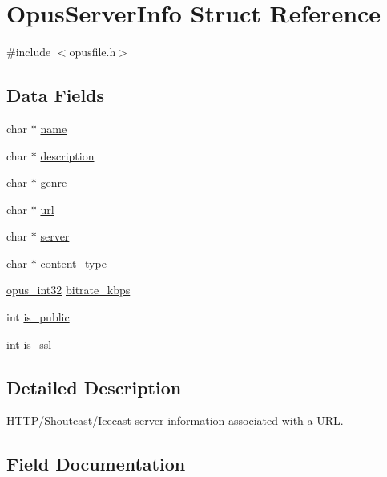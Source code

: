 \hypertarget{struct_opus_server_info}{}\section{Opus\+Server\+Info Struct Reference}
\label{struct_opus_server_info}


{\ttfamily \#include $<$opusfile.\+h$>$}

\subsection*{Data Fields}
\begin{DoxyCompactItemize}
\item 
char $\ast$ \hyperlink{struct_opus_server_info_a6c1e013bd64991b75709ef1d76f962b6}{name}
\item 
char $\ast$ \hyperlink{struct_opus_server_info_ab16d58f0d67d6473e12629676e2641ca}{description}
\item 
char $\ast$ \hyperlink{struct_opus_server_info_a293431ddf20c3baa3a4751ad08f518bb}{genre}
\item 
char $\ast$ \hyperlink{struct_opus_server_info_a7f9aef47413c849bb240ef70394401b1}{url}
\item 
char $\ast$ \hyperlink{struct_opus_server_info_a7aa583abd214ca9cefab6c1c99097202}{server}
\item 
char $\ast$ \hyperlink{struct_opus_server_info_a5f0120b006af1122cbdc72f3cbb68fd7}{content\+\_\+type}
\item 
\hyperlink{opus__types_8h_aa4d309d6f80b99dbabebc8f98879ab9a}{opus\+\_\+int32} \hyperlink{struct_opus_server_info_a1cf5db210f1cad5cf809bf54ddff68de}{bitrate\+\_\+kbps}
\item 
int \hyperlink{struct_opus_server_info_a9e81d2992f3009847c30bb4b0dc5c7de}{is\+\_\+public}
\item 
int \hyperlink{struct_opus_server_info_a3bce31c0a77548625a4d8125251e9b11}{is\+\_\+ssl}
\end{DoxyCompactItemize}


\subsection{Detailed Description}
H\+T\+T\+P/\+Shoutcast/\+Icecast server information associated with a U\+RL. 

\subsection{Field Documentation}
\mbox{\label{struct_opus_server_info_a1cf5db210f1cad5cf809bf54ddff68de}} 
